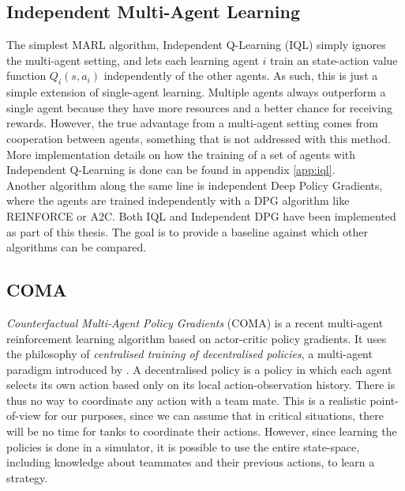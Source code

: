 \subsection{Independent Multi-Agent Learning}
\label{sec:intro_deep_indep_rl}
The simplest MARL algorithm, Independent Q-Learning (IQL) \cite{tan1993multi} simply ignores the multi-agent setting, and lets each learning agent $i$ train an state-action value function $Q_i(s, a_i)$ independently of the other agents. As such, this is just a simple extension of single-agent learning. Multiple agents always outperform a single agent because they have more resources and a better chance for receiving rewards. However, the true advantage from a multi-agent setting comes from cooperation between agents, something that is not addressed with this method. More implementation details on how the training of a set of agents with Independent Q-Learning is done can be found in appendix \ref{app:iql}.\\

Another algorithm along the same line is independent Deep Policy Gradients, where the agents are trained independently with a DPG algorithm like REINFORCE or A2C. Both IQL and Independent DPG have been implemented as part of this thesis. The goal is to provide a baseline against which other algorithms can be compared.


\subsection{COMA}
\label{sec:intro_coma}
\emph{Counterfactual Multi-Agent Policy Gradients} (COMA) \cite{foerster2018counterfactual} is a recent multi-agent reinforcement learning algorithm based on actor-critic policy gradients. It uses the philosophy of \emph{centralised training of decentralised policies}, a multi-agent paradigm introduced by \cite{oliehoek2008optimal}. A decentralised policy is a policy in which each agent selects its own action based only on its local action-observation history. There is thus no way to coordinate any action with a team mate. This is a realistic point-of-view for our purposes, since we can assume that in critical situations, there will be no time for tanks to coordinate their actions. However, since learning the policies is done in a simulator, it is possible to use the entire state-space, including knowledge about teammates and their previous actions, to learn a strategy.\\

